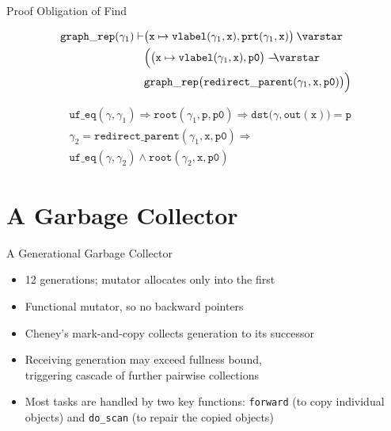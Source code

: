 \documentclass[usenames, xcolor=dvipsnames]{beamer}
\newcommand{\scon}{\mathbin{\varstar}}
\newcommand{\wand}{%
 \mathrel{\mbox{$\hspace*{-0.03em}\mathord{-}\hspace*{-0.66em}
  \mathord{-}\hspace*{-0.36em}\mathord{\scon}$\hspace*{-0.005em}}}}
\begin{document}
{\begin{frame}{Proof Obligation of Find}
  \centering
  \colorbox{lightg}{\parbox{.9\textwidth}{
  \begin{align*}
    \mathtt{graph\_rep}(\gamma_1) \vdash & \big(\mathtt{x}\mapsto
    \mathtt{vlabel}(\gamma_1, \mathtt{x}), \mathtt{prt}(\gamma_1, \mathtt{x})\big)
    \scon \null\\
    & \Big(\big(\mathtt{x}\mapsto \mathtt{vlabel}(\gamma_1, \mathtt{x}),
    \mathtt{p0}\big) \wand \null\\
    & \mathtt{graph\_rep}\big(\mathtt{redirect\_parent}(\gamma_1,\mathtt{x},
    \mathtt{p0})\big)\Big)
  \end{align*}}}
  \pause
  \vskip15pt
  \colorbox{lightg}{\parbox{.9\textwidth}{
  \begin{align*}
    & \mathtt{uf\_eq}(\gamma, \gamma_1) \Rightarrow \mathtt{root}(\gamma_1, \mathtt{p},
    \mathtt{p0}) \Rightarrow \mathtt{dst}\big(\gamma, \mathtt{out}(\mathtt{x})\big)=
    \mathtt{p}\\
    & \gamma_2=\mathtt{redirect\_parent}(\gamma_1,\mathtt{x},\mathtt{p0}) \Rightarrow\\
    & \mathtt{uf\_eq}(\gamma, \gamma_2) \wedge \mathtt{root}(\gamma_2, \mathtt{x},
    \mathtt{p0})
  \end{align*}}}
\end{frame}

\section{A Garbage Collector}

\begin{frame}{A Generational Garbage Collector}
  \begin{itemize}
  \item 12 generations; mutator allocates only into the first
  \item Functional mutator, so no backward pointers
  \pause
  \item Cheney's mark-and-copy collects generation to its successor
  \item Receiving generation may exceed fullness bound, \\
  triggering cascade of further pairwise collections
  \pause
  \item Most tasks are handled by two key functions: \texttt{forward} (to copy
  individual objects) and \texttt{do\_scan} (to repair the copied objects)
  \end{itemize}
\end{frame}

}
\end{document}
